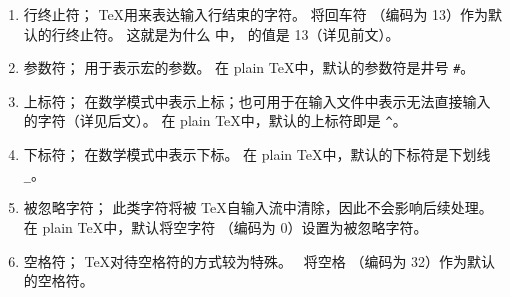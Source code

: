 \documentclass{book}
\begin{document}
\begin{enumerate}
\item{}\label{ini:eol}行终止符；
        \TeX 用来表达输入行结束的字符。
        \IniTeX 将回车符 （\ascii 编码为 13）作为默认的行终止符。
        这就是为什么 \IniTeX 中， 的值是 13（详见前文）。
\item{}参数符；
        用于表示宏的参数。
        在 plain \TeX 中，默认的参数符是井号 \verb-#-。
\item{}上标符；
        在数学模式中表示上标；也可用于在输入文件中表示无法直接输入的字符（详见后文）。
        在 plain \TeX 中，默认的上标符即是 \verb_^_。
\item{}下标符；
        在数学模式中表示下标。
        在 plain \TeX 中，默认的下标符是下划线 \verb-_-。
\item{}被忽略字符；
        此类字符将被 \TeX 自输入流中清除，因此不会影响后续处理。
        在 plain \TeX 中，默认将空字符 （\ascii 编码为 0）设置为被忽略字符。
\item{}\label{ini:sp}空格符；
        \TeX 对待空格符的方式较为特殊。
        \IniTeX\ 将空格 （\ascii 编码为 32）作为默认的空格符。

\end{enumerate}
\end{document}

